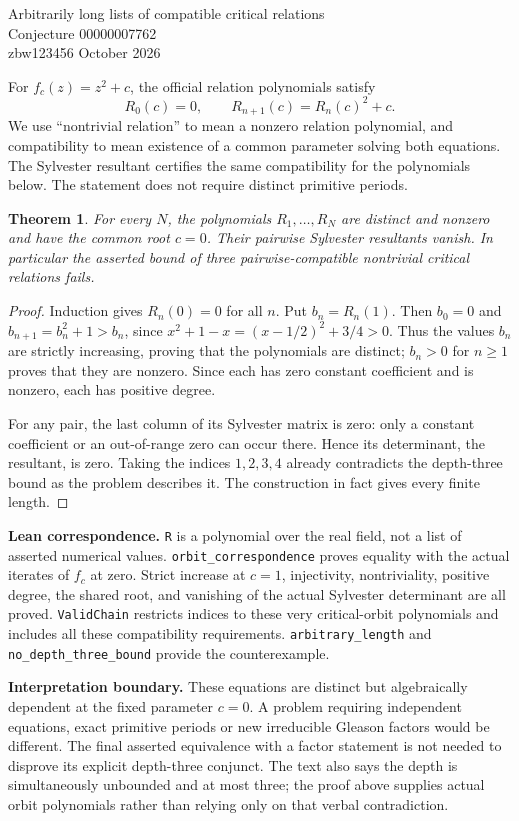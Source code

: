 \documentclass[11pt]{article}
\newtheorem{theorem}{Theorem}
\begin{document}
\begin{center}{\Large Arbitrarily long lists of compatible critical relations}\\[5pt]{\large Conjecture 00000007762}\\[5pt]zbw123456  October 2026\end{center}

For $f_c(z)=z^2+c$, the official relation polynomials satisfy
\[
R_0(c)=0,\qquad R_{n+1}(c)=R_n(c)^2+c.
\]
We use ``nontrivial relation'' to mean a nonzero relation polynomial, and compatibility to mean existence of a common parameter solving both equations. The Sylvester resultant certifies the same compatibility for the polynomials below. The statement does not require distinct primitive periods.
\begin{theorem}
For every $N$, the polynomials $R_1,\ldots,R_N$ are distinct and nonzero and have the common root $c=0$. Their pairwise Sylvester resultants vanish. In particular the asserted bound of three pairwise-compatible nontrivial critical relations fails.
\end{theorem}
\begin{proof}
Induction gives $R_n(0)=0$ for all $n$. Put $b_n=R_n(1)$. Then $b_0=0$ and $b_{n+1}=b_n^2+1>b_n$, since $x^2+1-x=(x-1/2)^2+3/4>0$. Thus the values $b_n$ are strictly increasing, proving that the polynomials are distinct; $b_n>0$ for $n\ge1$ proves that they are nonzero. Since each has zero constant coefficient and is nonzero, each has positive degree.

For any pair, the last column of its Sylvester matrix is zero: only a constant coefficient or an out-of-range zero can occur there. Hence its determinant, the resultant, is zero. Taking the indices $1,2,3,4$ already contradicts the depth-three bound as the problem describes it. The construction in fact gives every finite length.
\end{proof}
\textbf{Lean correspondence.} \texttt{R} is a polynomial over the real field, not a list of asserted numerical values. \texttt{orbit\_correspondence} proves equality with the actual iterates of $f_c$ at zero. Strict increase at $c=1$, injectivity, nontriviality, positive degree, the shared root, and vanishing of the actual Sylvester determinant are all proved. \texttt{ValidChain} restricts indices to these very critical-orbit polynomials and includes all these compatibility requirements. \texttt{arbitrary\_length} and \texttt{no\_depth\_three\_bound} provide the counterexample.

\textbf{Interpretation boundary.} These equations are distinct but algebraically dependent at the fixed parameter $c=0$. A problem requiring independent equations, exact primitive periods or new irreducible Gleason factors would be different. The final asserted equivalence with a factor statement is not needed to disprove its explicit depth-three conjunct. The text also says the depth is simultaneously unbounded and at most three; the proof above supplies actual orbit polynomials rather than relying only on that verbal contradiction.
\end{document}
